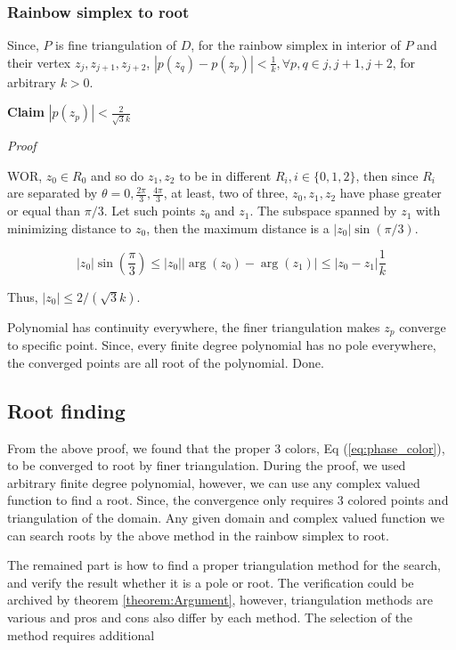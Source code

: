 \documentclass[a4paper,12pt]{article}
\begin{document}
\subsubsection{Rainbow simplex to root}
Since, $P$ is fine triangulation of $D$, for the rainbow simplex in interior of $P$ and
their vertex $z_j, z_{j+1}, z_{j+2}$, 
$|p(z_q)- p(z_p)| < \frac{1}{k}, \forall p, q \in {j, j+1, j+2}$, for arbitrary $k>0$.

\vspace{0.5cm}
\textbf{Claim} $|p(z_p)| < \frac{2}{\sqrt{3} k }$ 


\textit{Proof}

WOR, $z_0 \in R_0$ and so do $z_1, z_2$ to be in different $R_i, i \in \{0, 1, 2\}$, 
then since $R_i$ are separated by $\theta = 0, \frac{2 \pi}{3}, \frac{4 \pi}{3}$,
at least, two of three, $z_0, z_1, z_2$ have phase greater or equal than $\pi/3$.
Let such points $z_0$ and $z_1$.
The subspace spanned by $z_1$ with minimizing distance to $z_0$, then the maximum distance
is a $|z_0| \sin(\pi/3)$.

\begin{equation}
    |z_0| \sin(\frac{\pi}{3}) \leq |z_0| |\arg(z_0) - \arg(z_1)| \leq |z_0 - z_1| \frac{1}{k}
\end{equation}

Thus, $|z_0| \leq 2/(\sqrt{3} k)$. 

Polynomial has continuity everywhere, the finer triangulation makes $z_p$ converge to specific point. 
Since, every finite degree polynomial has no pole everywhere, the converged points are all root of the polynomial. 
Done.

\subsection{Root finding}
From the above proof, we found that the proper 3 colors, Eq (\ref{eq:phase_color}),
to be converged to root by finer triangulation.
During the proof, we used arbitrary finite degree polynomial, however,
we can use any complex valued function to find a root.
Since, the convergence only requires 3 colored points and 
triangulation of the domain. 
Any given domain and complex valued function we can 
search roots by the above method in the rainbow simplex to root.

The remained part is how to find a proper triangulation method for the search,
and verify the result whether it is a pole or root.
The verification could be archived by theorem \ref{theorem:Argument}, however,
triangulation methods are various and pros and cons also differ by each method.
The selection of the method requires additional 
\end{document}
